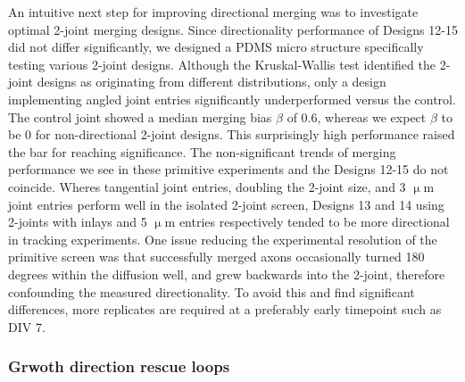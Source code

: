 An intuitive next step for improving directional merging was to investigate
optimal 2-joint merging designs. Since directionality performance of Designs
12-15 did not differ significantly, we designed a PDMS micro structure
specifically testing various 2-joint designs. Although the Kruskal-Wallis test
identified the 2-joint designs as originating from different distributions, only
a design implementing angled joint entries significantly underperformed versus
the control. The control joint showed a median merging bias $\beta$ of 0.6,
whereas we expect $\beta$ to be 0 for non-directional 2-joint designs. This
surprisingly high performance raised the bar for reaching significance. The
non-significant trends of merging performance we see in these primitive
experiments and the Designs 12-15 do not coincide. Wheres tangential joint
entries, doubling the 2-joint size, and 3 $\upmu$m joint entries perform well in
the isolated 2-joint screen, Designs 13 and 14 using 2-joints with inlays and 5
$\upmu$m entries respectively tended to be more directional in tracking
experiments. One issue reducing the experimental resolution of the primitive
screen was that successfully merged axons occasionally turned 180 degrees within
the diffusion well, and grew backwards into the 2-joint, therefore confounding
the measured directionality. To avoid this and find significant differences,
more replicates are required at a preferably early timepoint such as DIV 7. 

\subsubsection{Grwoth direction rescue loops}

